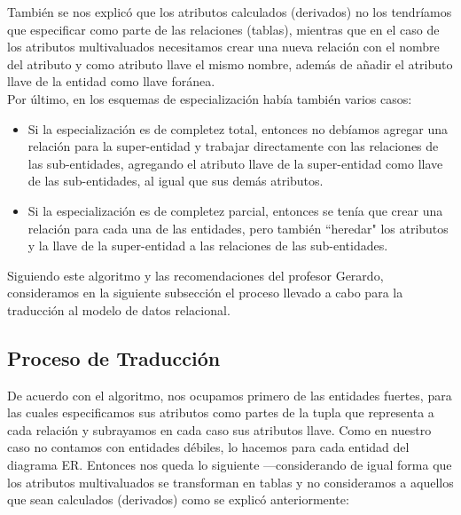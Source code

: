 \documentclass[11pt,letterpaper]{article}
\begin{document}
También se nos explicó que los atributos calculados (derivados) no los tendríamos que especificar como parte de las relaciones (tablas), mientras que en el caso de los atributos multivaluados necesitamos crear una nueva relación con el nombre del atributo y como atributo llave el mismo nombre, además de añadir el atributo llave de la entidad como llave foránea.\\


Por último, en los esquemas de especialización había también varios casos:

\begin{itemize}
\item Si la especialización es de completez total, entonces no debíamos agregar una relación para la super-entidad y trabajar directamente con las relaciones de las sub-entidades, agregando el atributo llave de la super-entidad como llave de las sub-entidades, al igual que sus demás atributos.
\item Si la especialización es de completez parcial, entonces se tenía que crear una relación para cada una de las entidades, pero también ``heredar" los atributos y la llave de la super-entidad a las relaciones de las sub-entidades.
\end{itemize} 

Siguiendo este algoritmo y las recomendaciones del profesor Gerardo, consideramos en la siguiente subsección el proceso llevado a cabo para la traducción al modelo de datos relacional.

\subsection{Proceso de Traducción}

De acuerdo con el algoritmo, nos ocupamos primero de las entidades fuertes, para las cuales especificamos sus atributos como partes de la tupla que representa a cada relación y subrayamos en cada caso sus atributos llave. Como en nuestro caso no contamos con entidades débiles, lo hacemos para cada entidad del diagrama ER. Entonces nos queda lo siguiente ---considerando de igual forma que los atributos multivaluados se transforman en tablas y no consideramos a aquellos que sean calculados (derivados) como se explicó anteriormente:
\end{document}
